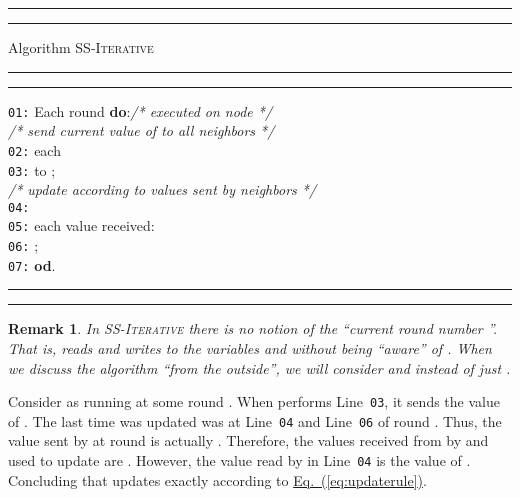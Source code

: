 \documentclass[preprint,12pt]{elsarticle}
\newtheorem{remark}{Remark}
\newcommand{\namedrefeq}[2]{\hyperref[#2]{#1~\mbox{\rm(\ref*{#2})}}}
\newcommand{\equationref}[1]{\namedrefeq{Eq.}{#1}}
\newcommand{\tb}{\makebox[0.4cm]{}}
\newcommand{\due}{\makebox[0.8cm]{}}
\newcommand{\syncAlg}{\textsc{SS-Iterative}\xspace}
\newcommand{\linenumber}[1]{{\tt #1}}
\newcommand{\lineref}[1]{Line~\linenumber{#1}}
\begin{document}
\begin{figure*}[h]
\begin{center}
\begin{minipage}{4.8in}
\hrule \hrule \vspace{1.7mm} \footnotesize
\setlength{\baselineskip}{3.9mm} \noindent Algorithm \syncAlg
 \vspace{1mm} \hrule \hrule
\vspace{1mm}

\linenumber{01:} Each round {\bf do}:\hfill\textit{/* executed on
node 
*/}\\

\makebox[0.93cm]{} \textit{/* send current value of  to all neighbors */}\\
\linenumber{02:} \tb {\bf for} each   \\
\linenumber{03:} \due {\bf send}  to ; \\

\makebox[0.93cm]{} \textit{/* update  according to values sent by neighbors */}\\
\linenumber{04:} \tb {\bf set}   \\
\linenumber{05:} \tb {\bf for} each value  received:  \\
\linenumber{06:} \due {\bf update} ;\\

\linenumber{07:} {\bf od}.

\normalsize \vspace{1mm} \hrule\hrule
\end{minipage}
 \caption{A self-stabilizing iterative algorithm.}\label{figure:syncAlg}
 \end{center}
\end{figure*}

\begin{remark}
  In \syncAlg there is no notion of the ``current round number
  ''. That is,  reads and writes to the variables  and 
  without being ``aware'' of . When we discuss the algorithm ``from the outside'', we will consider  and  instead of
  just .
\end{remark}

Consider  as running at some round . When  performs
\lineref{03}, it sends the value of . The last time
 was updated was at \lineref{04} and \lineref{06} of
round . Thus, the value sent by  at round  is
actually . Therefore, the values received from 
by  and used to update  are .
However, the value read by  in \lineref{04} is the value of
. Concluding that  updates 
exactly according to \equationref{eq:updaterule}.
\end{document}
